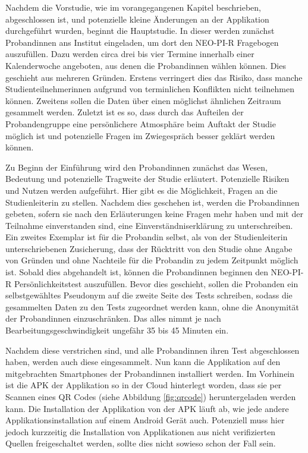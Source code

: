 Nachdem die Vorstudie, wie im vorangegangenen Kapitel beschrieben, abgeschlossen ist, und potenzielle kleine Änderungen an der Applikation durchgeführt wurden, beginnt die Hauptstudie.
In dieser werden zunächst Probandinnen ans Institut eingeladen, um dort den NEO-PI-R Fragebogen auszufüllen.
Dazu werden circa drei bis vier Termine innerhalb einer Kalenderwoche angeboten, aus denen die Probandinnen wählen können.
Dies geschieht aus mehreren Gründen. 
Erstens verringert dies das Risiko, dass manche Studienteilnehmerinnen aufgrund von terminlichen Konflikten nicht teilnehmen können.
Zweitens sollen die Daten über einen möglichst ähnlichen Zeitraum gesammelt werden.
Zuletzt ist es so, dass durch das Aufteilen der Probandengruppe eine persönlichere Atmosphäre beim Auftakt der Studie möglich ist
und potenzielle Fragen im Zwiegespräch besser geklärt werden können.
\par
Zu Beginn der Einführung wird den Probandinnen zunächst das Wesen, Bedeutung und potenzielle Tragweite der Studie erläutert.
Potenzielle Risiken und Nutzen werden aufgeführt.
Hier gibt es die Möglichkeit, Fragen an die Studienleiterin zu stellen.
Nachdem dies geschehen ist, werden die Probandinnen gebeten, sofern sie nach den Erläuterungen keine Fragen mehr haben und mit der Teilnahme einverstanden sind, eine Einverständniserklärung zu unterschreiben.
Ein zweites Exemplar ist für die Probandin selbst, als von der Studienleiterin unterschriebenen Zusicherung, dass der Rücktritt von den Studie ohne Angabe von Gründen und ohne Nachteile für die Probandin zu jedem Zeitpunkt möglich ist.
Sobald dies abgehandelt ist, können die Probandinnen beginnen den NEO-PI-R Persönlichkeitstest auszufüllen.
Bevor dies geschieht, sollen die Probanden ein selbstgewähltes Pseudonym auf die zweite Seite des Tests schreiben, sodass die gesammelten Daten zu den Tests zugeordnet werden kann, ohne die Anonymität der Probandinnen einzuschränken.
Das alles nimmt je nach Bearbeitungsgeschwindigkeit ungefähr 35 bis 45 Minuten ein.
\par
Nachdem diese verstrichen sind, und alle Probandinnen ihren Test abgeschlossen haben, werden auch diese eingesammelt.
Nun kann die Applikation auf den mitgebrachten Smartphones der Probandinnen installiert werden.
Im Vorhinein ist die APK der Applikation so in der Cloud hinterlegt worden, dass sie per Scannen eines QR Codes (siehe Abbildung \ref{fig:qrcode}) heruntergeladen werden kann.
Die Installation der Applikation von der APK läuft ab, wie jede andere Applikationsinstallation auf einem Android Gerät auch.
Potenziell muss hier jedoch kurzzeitig die Installation von Applikationen aus nicht verifizierten Quellen freigeschaltet werden, sollte dies nicht sowieso schon der Fall sein.
